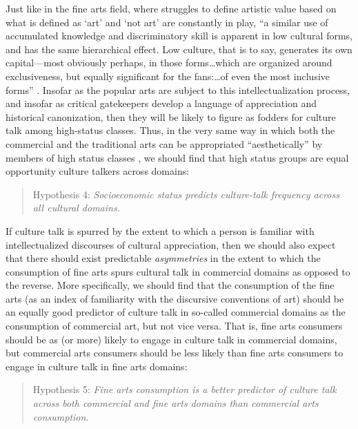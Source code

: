 Just like in the fine arts field, where struggles to define artistic value based on what is defined as `art' and `not art' are constantly in play, ``a similar use of accumulated knowledge and discriminatory skill is apparent in low cultural forms, and has the same hierarchical effect.  Low culture, that is to say, generates its own capital---most obviously perhaps, in those forms{\ldots}which are organized around  exclusiveness, but equally significant for the fans:{\ldots}of even the most inclusive forms'' \citep[9]{frith98}. Insofar as the popular arts are subject to this intellectualization process, and insofar as critical gatekeepers develop a language of appreciation and historical canonization, then they will be likely to figure as fodders for culture talk among high-status classes. Thus, in the very same way in which both the commercial and the traditional arts can be appropriated ``aesthetically'' by members of high status classes \citep{peterson_kern96}, we should find that high status groups are equal opportunity culture talkers across domains:

\begin{quote}
Hypothesis 4:  \emph{Socioeconomic status predicts culture-talk frequency across all cultural domains.}
\end{quote}

If culture talk is spurred by the extent to which a person is familiar with intellectualized discourses of cultural appreciation, then we should also expect that there should exist predictable \emph{asymmetries} in the extent to which the consumption of fine arts spurs cultural talk in commercial domains as opposed to the reverse. More specifically, we should find that the consumption of the fine arts (as an index of familiarity with the discursive conventions of art) should be an equally good predictor of culture talk in so-called commercial domains as the consumption of commercial art, but not vice versa. That is, fine arts consumers should be as (or more) likely to engage in culture talk in commercial domains, but commercial arts consumers should be less likely than fine arts consumers to engage in culture talk in fine arts domains:

\begin{quote}
Hypothesis 5:  \emph{Fine arts consumption is a better predictor of culture talk across both commercial and fine arts domains than commercial arts consumption.}
\end{quote}


